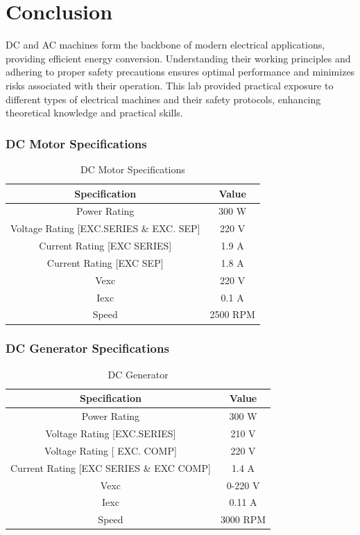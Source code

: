\documentclass[a4paper,12pt]{article}
\begin{document}
	\section{Conclusion}
	DC and AC machines form the backbone of modern electrical applications, providing efficient energy conversion. Understanding their working principles and adhering to proper safety precautions ensures optimal performance and minimizes risks associated with their operation. This lab provided practical exposure to different types of electrical machines and their safety protocols, enhancing theoretical knowledge and practical skills.
	
	\subsubsection{DC Motor Specifications}
	\begin{table}[H]
		\centering
		\caption{DC Motor Specifications}
		\begin{tabular}{| c | c |}
			\hline
			\textbf{Specification} & \textbf{Value} \\ \hline
			Power Rating & 300 W\\ \hline
			Voltage Rating [EXC.SERIES \& EXC. SEP] & 220 V \\ \hline
			Current Rating [EXC SERIES] & 1.9 A \\ \hline
			Current Rating [EXC SEP] & 1.8 A \\ \hline
			Vexc & 220 V \\ \hline
			Iexc & 0.1 A \\ \hline
			Speed & 2500 RPM \\ \hline
			
		\end{tabular}
		
		
		\label{tab:2}
	\end{table}
	
	\subsubsection{DC Generator Specifications}
	\begin{table}[H]
		\centering
		\caption{DC Generator}
		\begin{tabular}{| c | c |}
			\hline
			\textbf{Specification} & \textbf{Value} \\ \hline
			Power Rating & 300 W\\ \hline
			Voltage Rating [EXC.SERIES] & 210 V \\ \hline
			Voltage Rating [ EXC. COMP] & 220 V \\ \hline
			Current Rating [EXC SERIES \& EXC COMP] & 1.4 A \\ \hline
			Vexc & 0-220 V \\ \hline
			Iexc & 0.11 A \\ \hline
			Speed & 3000 RPM \\ \hline
			
		\end{tabular}
		
		\label{tab:2}
	\end{table}
	
\end{document}
